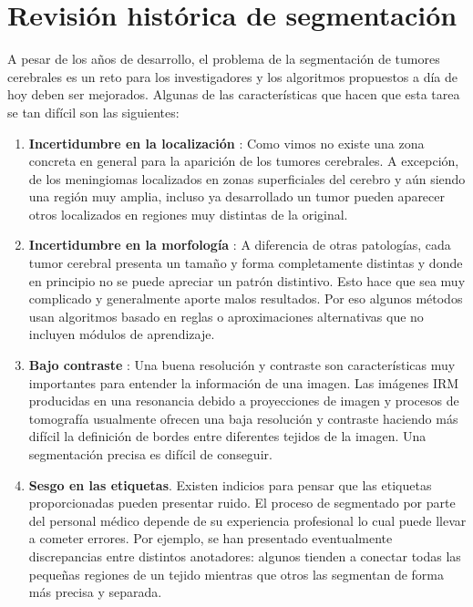 \section{Revisión histórica de segmentación}

A pesar de los años de desarrollo, el problema de la segmentación de tumores cerebrales es un reto  para los investigadores y los algoritmos propuestos a día de hoy deben ser mejorados. Algunas de las características que hacen que esta tarea se tan difícil son las siguientes:

\begin{enumerate}
	\item \textbf{Incertidumbre en la localización} : Como vimos no existe una zona concreta en general para la aparición de los tumores cerebrales. A excepción, de los meningiomas localizados en zonas superficiales del cerebro y aún siendo una región muy amplia, incluso ya desarrollado un tumor pueden aparecer otros localizados en regiones muy distintas de la original. 
	\item \textbf{Incertidumbre en la morfología} : A diferencia de otras patologías, cada tumor cerebral presenta un tamaño y forma completamente distintas y donde en principio no se puede apreciar un patrón distintivo. Esto hace que sea muy complicado y generalmente aporte malos resultados. Por eso algunos métodos usan algoritmos basado en reglas o aproximaciones alternativas que no incluyen módulos de aprendizaje.
	
	\item \textbf{Bajo contraste} : Una buena resolución y contraste son características muy importantes para entender la información de una imagen. Las imágenes IRM producidas en una resonancia debido a proyecciones de imagen y procesos de tomografía usualmente ofrecen una baja resolución y contraste haciendo más difícil la definición de bordes entre diferentes tejidos de la imagen. Una segmentación precisa es difícil de conseguir.
	
	\item \textbf{Sesgo en las etiquetas}. Existen indicios para pensar que las etiquetas proporcionadas pueden presentar ruido. El proceso de segmentado por parte del personal médico 
	depende de su experiencia profesional lo cual puede llevar a cometer errores. Por ejemplo, se han presentado eventualmente discrepancias entre distintos anotadores: algunos tienden a conectar todas las pequeñas regiones de un tejido mientras que otros las segmentan de forma más precisa y separada. 
	

\end{enumerate}
